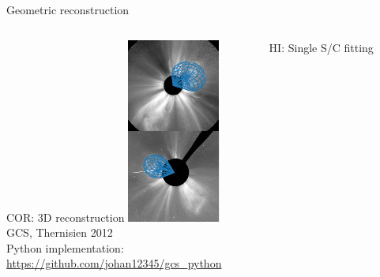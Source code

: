 \documentclass[10pt,aspectratio=169,usenames,dvipsnames]{beamer}
\begin{document}
\begin{frame}{Geometric reconstruction}
    \begin{columns}[t]
        \begin{column}{0.32\textwidth}
            \begin{block}{COR: 3D reconstruction}
                \centering
                \includegraphics[height=0.65\textheight]{plots/gcs.pdf}\\[-1.5mm]
                {\footnotesize GCS, Thernisien 2012}\\
                {\scriptsize Python implementation:\\[-2mm] \tiny\url{https://github.com/johan12345/gcs_python}}
            \end{block} 
            
        \end{column}
        \begin{column}{0.32\textwidth}
            \begin{block}{HI: Single S/C fitting}     
                            \centering       
\end{block}
\end{column}
\end{columns}
\end{frame}
\end{document}
